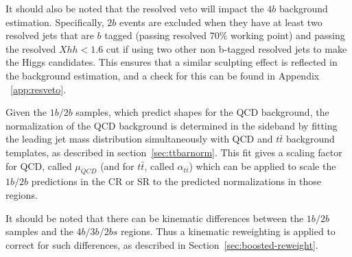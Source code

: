 \label{par:boosted-qcd-2bseperate}

It should also be noted that the resolved veto will impact the $4b$ background estimation.  Specifically, $2b$ events are excluded when they have at least two resolved jets that are $b$ tagged (passing resolved $70\%$ working point) and passing the resolved $Xhh < 1.6$ cut if using two other non b-tagged resolved jets to make the Higgs candidates. This ensures that a similar sculpting effect is reflected in the background estimation, and a check for this can be found in Appendix ~\ref{app:resveto}.

Given the $1b/2b$ samples, which predict shapes for the QCD background, the normalization of the QCD background is determined in the sideband by fitting the leading jet mass distribution simultaneously with QCD and $t\bar{t}$ background templates, as described in section~\ref{sec:ttbarnorm}.  This fit gives a scaling factor for QCD, called $\mu_{QCD}$ (and for $t\bar{t}$, called $\alpha_{t\bar{t}}$) which can be applied to scale the $1b/2b$ predictions in the CR or SR to the predicted normalizations in those regions.

It should be noted that there can be kinematic differences between the  $1b/2b$ samples and the $4b/3b/2bs$ regions.  Thus a kinematic reweighting is applied to correct for such differences, as described in Section~\ref{sec:boosted-reweight}.






